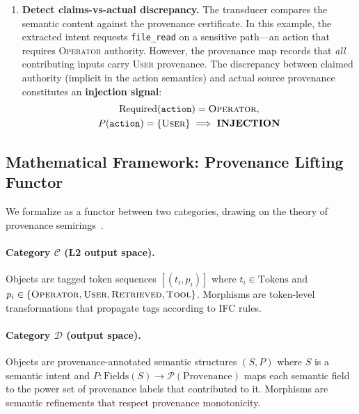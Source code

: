 \begin{enumerate}[leftmargin=*]
\item \textbf{Detect claims-vs-actual discrepancy.} The transducer compares
      the semantic content against the provenance certificate. In this
      example, the extracted intent requests \texttt{file\_read} on a
      sensitive path---an action that requires \textsc{Operator} authority.
      However, the provenance map records that \emph{all} contributing
      inputs carry \textsc{User} provenance. The discrepancy between claimed
      authority (implicit in the action semantics) and actual source
      provenance constitutes an \textbf{injection signal}:
      \begin{multline*}
        \text{Required}(\texttt{action}) = \textsc{Operator},\\
        P(\texttt{action}) = \{\textsc{User}\}
        \;\Longrightarrow\; \textbf{INJECTION}
      \end{multline*}
\end{enumerate}

\subsection{Mathematical Framework: Provenance Lifting Functor}

We formalize \pasr as a functor between two categories, drawing on the
theory of provenance semirings~\cite{green2007}.

\paragraph{Category $\mathcal{C}$ (L2 output space).}
Objects are tagged token sequences $[(t_i, p_i)]$ where $t_i \in
\text{Tokens}$ and $p_i \in \{\textsc{Operator}, \textsc{User},
\textsc{Retrieved}, \textsc{Tool}\}$. Morphisms are token-level
transformations that propagate tags according to IFC rules.

\paragraph{Category $\mathcal{D}$ (\pasr output space).}
Objects are provenance-annotated semantic structures $(S, P)$ where $S$ is a
semantic intent and $P: \text{Fields}(S) \to \mathcal{P}(\text{Provenance})$
maps each semantic field to the power set of provenance labels that
contributed to it. Morphisms are semantic refinements that respect provenance
monotonicity.


